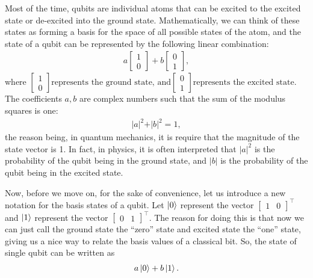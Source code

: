 \documentclass[a4paper,11pt]{article}
\numberwithin{equation}{section}
\theoremstyle{definition}
\begin{document}
Most of the time, qubits are individual atoms that can be excited to the excited state or de-excited into the ground state. Mathematically, we can think of these states as forming a basis for the space of all possible states of the atom, and the state of a qubit can be represented by the following linear combination:
\begin{align*}
a\begin{bmatrix}
1\\0
\end{bmatrix}
+
b\begin{bmatrix}
0\\1
\end{bmatrix},
\end{align*} 
where 
$
\begin{bmatrix}
1\\0
\end{bmatrix} \text{represents the ground state, and}
\begin{bmatrix}
0\\1
\end{bmatrix} \text{represents the excited state}
$. The coefficients $a,b$ are complex numbers such that the sum of the modulus squares is one:
\begin{align*}
\vert a \vert^2 + \vert b\vert^2 = 1,
\end{align*}
the reason being, in quantum mechanics, it is require that the magnitude of the state vector is 1. In fact, in physics, it is often interpreted that $\vert a \vert^2$ is the probability of the qubit being in the ground state, and $\vert b\vert$ is the probability of the qubit being in the excited state. 

Now, before we move on, for the sake of convenience, let us introduce a new notation for the basis states of a qubit. Let $\left\vert{0}\right\rangle$ represent the vector $\begin{bmatrix}
1 & 0
\end{bmatrix}^\top$ and $\left\vert{1}\right\rangle$ represent the vector $\begin{bmatrix}
0&1
\end{bmatrix}^\top$. The reason for doing this is that now we can just call the ground state the ``zero'' state and excited state the ``one'' state, giving us a nice way to relate the basis values of a classical bit. So, the state of single qubit can be  written as
\begin{align*}
a\left\vert{0}\right\rangle + b\left\vert{1}\right\rangle.
\end{align*}
\end{document}
